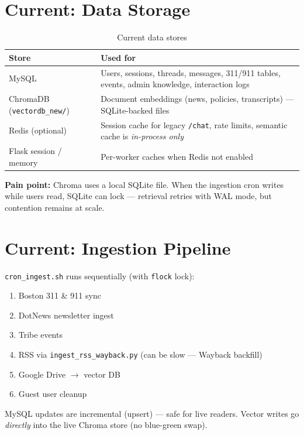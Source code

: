 \documentclass[11pt,a4paper]{article}
\begin{document}
\section{Current: Data Storage}

\begin{table}[h]
\centering
\small
\begin{tabular}{@{}ll@{}}
\toprule
\textbf{Store} & \textbf{Used for} \\
\midrule
MySQL & Users, sessions, threads, messages, 311/911 tables, events, admin knowledge, interaction logs \\
ChromaDB (\texttt{vectordb\_new/}) & Document embeddings (news, policies, transcripts) --- SQLite-backed files \\
Redis (optional) & Session cache for legacy \texttt{/chat}, rate limits, semantic cache is \emph{in-process only} \\
Flask session / memory & Per-worker caches when Redis not enabled \\
\bottomrule
\end{tabular}
\caption{Current data stores}
\end{table}

\textbf{Pain point:} Chroma uses a local SQLite file. When the ingestion cron writes while users read, SQLite can lock --- retrieval retries with WAL mode, but contention remains at scale.

\section{Current: Ingestion Pipeline}

\texttt{cron\_ingest.sh} runs sequentially (with \texttt{flock} lock):
\begin{enumerate}[noitemsep]
  \item Boston 311 \& 911 sync
  \item DotNews newsletter ingest
  \item Tribe events
  \item RSS via \texttt{ingest\_rss\_wayback.py} (can be slow --- Wayback backfill)
  \item Google Drive $\rightarrow$ vector DB
  \item Guest user cleanup
\end{enumerate}

MySQL updates are incremental (upsert) --- safe for live readers. Vector writes go \emph{directly} into the live Chroma store (no blue-green swap).
\end{document}
